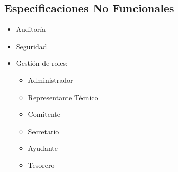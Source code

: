 \subsection*{Especificaciones No Funcionales}
\begin{itemize}
	\item Auditor\'ia
	\item Seguridad
	\item Gesti\'on de roles:
	\begin{itemize}
		\item Administrador
		\item Representante T\'ecnico
		\item Comitente
		\item Secretario
		\item Ayudante
		\item Tesorero
	\end{itemize}
\end{itemize}
